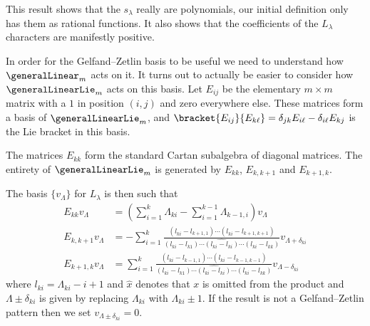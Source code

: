 This result shows that the \(s_\lambda\) really are polynomials, our initial definition only has them as rational functions.
It also shows that the coefficients of the \(L_\lambda\) characters are manifestly positive.

In order for the Gelfand--Zetlin basis to be useful we need to understand how \(\generalLinear_m\) acts on it.
It turns out to actually be easier to consider how \(\generalLinearLie_m\) acts on this basis.
Let \(E_{ij}\) be the elementary \(m \times m\) matrix with a \(1\) in position \((i,j)\) and zero everywhere else.
These matrices form a basis of \(\generalLinearLie_m\), and \(\bracket{E_{ij}}{E_{k\ell}} = \delta_{jk}E_{i\ell} - \delta_{i\ell} E_{kj}\) is the Lie bracket in this basis.

The matrices \(E_{kk}\) form the standard Cartan subalgebra of diagonal matrices.
The entirety of \(\generalLinearLie_m\) is generated by \(E_{kk}\), \(E_{k,k+1}\) and \(E_{k+1,k}\).

The basis \(\{v_\Lambda\}\) for \(L_\lambda\) is then such that
\begin{align}
    E_{kk} v_\Lambda &= \left( \sum_{i=1}^k \Lambda_{ki} - \sum_{i=1}^{k-1} \Lambda_{k-1,i} \right)v_\Lambda\\
    E_{k,k+1} v_\Lambda &= -\sum_{i=1}^k \frac{(l_{ki} - l_{k+1,1}) \dotsm (l_{ki} - l_{k+1,k+1})}{(l_{ki} - l_{k1}) \dotsm \widehat{(l_{ki} - l_{ki})} \dotsm (l_{ki} - l_{kk})} v_{\Lambda + \delta_{ki}}\\
    E_{k+1,k} v_\Lambda &= \sum_{i=1}^k \frac{(l_{ki} - l_{k-1,1}) \dotsm (l_{ki} - l_{k-1,k-1})}{(l_{ki} - l_{k1}) \dotsm \widehat{(l_{ki} - l_{ki})} \dotsm (l_{ki} - l_{kk})} v_{\Lambda - \delta_{ki}}
\end{align}
where \(l_{ki} = \Lambda_{ki} - i + 1\) and \(\widehat{x}\) denotes that \(x\) is omitted from the product and \(\Lambda \pm \delta_{ki}\) is given by replacing \(\Lambda_{ki}\) with \(\Lambda_{ki} \pm 1\).
If the result is not a Gelfand--Zetlin pattern then we set \(v_{\Lambda \pm \delta_{ki}} = 0\).

